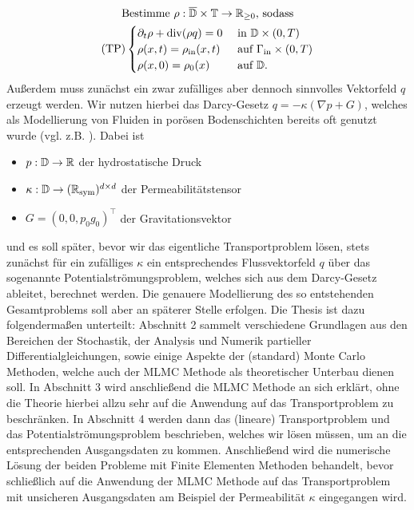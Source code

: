\begin{gather*}
\text{Bestimme } \rho: \overline{\mathbb{D}} \times \mathbb{T} \to \mathbb{R}_{\geq 0} \text{, sodass}\\
(\text{TP})
\begin{cases}
\partial_t \rho + \operatorname{div}(\rho q) = 0 &\text{ in } \mathbb{D} \times (0,T)\\
\rho(x,t) = \rho_{\text{in}}(x,t) &\text{ auf } \Gamma_{\text{in}} \times (0,T)\\
\rho(x,0) = \rho_0(x) &\text{ auf } \mathbb{D}.
\end{cases}
\end{gather*}
Außerdem muss zunächst ein zwar zufälliges aber dennoch sinnvolles Vektorfeld $q$ erzeugt werden. Wir nutzen hierbei das Darcy-Gesetz $q = - \kappa (\nabla p + G)$, welches als Modellierung von Fluiden in porösen Bodenschichten bereits oft genutzt wurde (vgl. z.B. \cite{de1986quantitative}).
Dabei ist 
\begin{itemize}
	\item $p:\mathbb{D} \rightarrow \mathbb{R}$ der hydrostatische Druck
	\item $\kappa: \mathbb{D} \rightarrow (\mathbb{R}_{\text{sym}})^{d \times d}$ der Permeabilitätstensor 
	\item $G = (0,0,p_0 g_0)^{\top}$ der Gravitationsvektor	
\end{itemize}
und es soll später, bevor wir das eigentliche Transportproblem lösen, stets zunächst für ein zufälliges $\kappa$ ein entsprechendes Flussvektorfeld $q$ über das sogenannte Potentialströmungsproblem, welches sich aus dem Darcy-Gesetz ableitet, berechnet werden. 
Die genauere Modellierung des so entstehenden Gesamtproblems soll aber an späterer Stelle erfolgen. \newline
Die Thesis ist dazu folgendermaßen unterteilt:\newline 
Abschnitt 2 sammelt verschiedene Grundlagen aus den Bereichen der Stochastik, der Analysis und Numerik partieller Differentialgleichungen, sowie einige Aspekte der (standard) Monte Carlo Methoden, welche auch der MLMC Methode als theoretischer Unterbau dienen soll. \newline
In Abschnitt 3 wird anschließend die MLMC Methode an sich erklärt, ohne die Theorie hierbei allzu sehr auf die Anwendung auf das Transportproblem zu beschränken. \newline
In Abschnitt 4 werden dann das (lineare) Transportproblem und das Potentialströmungsproblem beschrieben, welches wir lösen müssen, um an die entsprechenden Ausgangsdaten zu kommen. Anschließend wird die numerische Lösung der beiden Probleme mit Finite Elementen Methoden behandelt, bevor schließlich auf die Anwendung der MLMC Methode auf das Transportproblem mit unsicheren Ausgangsdaten am Beispiel der Permeabilität $\kappa$ eingegangen wird. \newline
